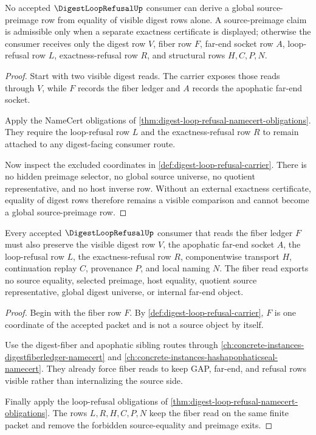 \begin{theorem}
\label{thm:digest-loop-refusal-no-global-preimage}
No accepted $\DigestLoopRefusalUp$ consumer can derive a global source-preimage row from equality of visible digest rows alone. A source-preimage claim is admissible only when a separate exactness certificate is displayed; otherwise the consumer receives only the digest row $V$, fiber row $F$, far-end socket row $A$, loop-refusal row $L$, exactness-refusal row $R$, and structural rows $H,C,P,N$.
\end{theorem}
\begin{proof}
Start with two visible digest reads. The carrier exposes those reads through $V$, while $F$ records the fiber ledger and $A$ records the apophatic far-end socket.

Apply the NameCert obligations of \autoref{thm:digest-loop-refusal-namecert-obligations}. They require the loop-refusal row $L$ and the exactness-refusal row $R$ to remain attached to any digest-facing consumer route.

Now inspect the excluded coordinates in \autoref{def:digest-loop-refusal-carrier}. There is no hidden preimage selector, no global source universe, no quotient representative, and no host inverse row. Without an external exactness certificate, equality of digest rows therefore remains a visible comparison and cannot become a global source-preimage row.
\end{proof}

\begin{theorem}
\label{thm:digest-loop-refusal-fiber-nonescape}
Every accepted $\DigestLoopRefusalUp$ consumer that reads the fiber ledger $F$ must also preserve the visible digest row $V$, the apophatic far-end socket $A$, the loop-refusal row $L$, the exactness-refusal row $R$, componentwise transport $H$, continuation replay $C$, provenance $P$, and local naming $N$. The fiber read exports no source equality, selected preimage, host equality, quotient source representative, global digest universe, or internal far-end object.
\end{theorem}
\begin{proof}
Begin with the fiber row $F$. By \autoref{def:digest-loop-refusal-carrier}, $F$ is one coordinate of the accepted packet and is not a source object by itself.

Use the digest-fiber and apophatic sibling routes through \autoref{ch:concrete-instances-digestfiberledger-namecert} and \autoref{ch:concrete-instances-hashapophaticseal-namecert}. They already force fiber reads to keep GAP, far-end, and refusal rows visible rather than internalizing the source side.

Finally apply the loop-refusal obligations of \autoref{thm:digest-loop-refusal-namecert-obligations}. The rows $L,R,H,C,P,N$ keep the fiber read on the same finite packet and remove the forbidden source-equality and preimage exits.
\end{proof}

